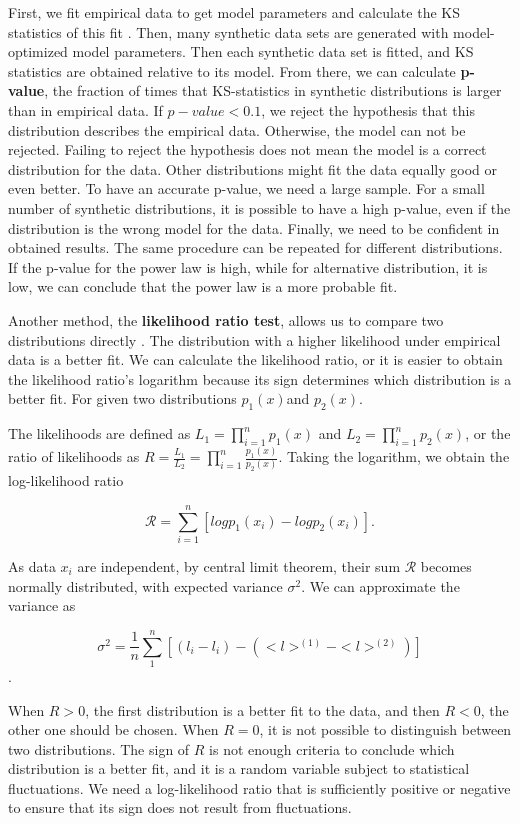 First, we fit empirical data to get model parameters and calculate the KS statistics of this fit \cite{clauset2009power}. Then, many synthetic data sets are generated with model-optimized model parameters. Then each synthetic data set is fitted, and KS statistics are obtained relative to its model. From there, we can calculate \textbf{p-value}, the fraction of times that KS-statistics in synthetic distributions is larger than in empirical data.  If $p-value<0.1$, we reject the hypothesis that this distribution describes the empirical data. Otherwise, the model can not be rejected. Failing to reject the hypothesis does not mean the model is a correct distribution for the data. Other distributions might fit the data equally good or even better. To have an accurate p-value, we need a large sample. For a small number of synthetic distributions, it is possible to have a high p-value, even if the distribution is the wrong model for the data. Finally, we need to be confident in obtained results. The same procedure can be repeated for different distributions. If the p-value for the power law is high, while for alternative distribution, it is low, we can conclude that the power law is a more probable fit. 

Another method, the \textbf{likelihood ratio test}, allows us to compare two distributions directly \cite{clauset2009power}. The distribution with a higher likelihood under empirical data is a better fit. We can calculate the likelihood ratio, or it is easier to obtain the likelihood ratio's logarithm because its sign determines which distribution is a better fit. For given two distributions $p_1(x)$and $p_2(x)$. 

The likelihoods are defined as $L_1=\prod_{i=1}^{n}p_1(x)$ and $L_2=\prod_{i=1}^{n}p_2(x)$, or the ratio of likelihoods as $R=\frac{L_1}{L_2} = \prod_{i=1}^{n} \frac{p_1(x)}{p_2(x)}$. Taking the logarithm, we obtain the log-likelihood ratio

\begin{equation}
\mathcal{R} = \sum_{i=1}^{n} \left[log p_1(x_i) - log p_2(x_i)\right].
\end{equation}

As data $x_i$ are independent, by central limit theorem, their sum $\mathcal{R}$ becomes normally distributed, with expected variance $\sigma^2$. We can approximate the variance as 

$$\sigma^2 = \frac{1}{n}\sum_{1}^{n}[(l_i - l_i) - (<l>^{(1)}- <l>^{(2)})]$$.

When $R>0$, the first distribution is a better fit to the data, and then $R<0$, the other one should be chosen. When $R=0$, it is not possible to distinguish between two distributions. The sign of $R$ is not enough criteria to conclude which distribution is a better fit, and it is a random variable subject to statistical fluctuations. We need a log-likelihood ratio that is sufficiently positive or negative to ensure that its sign does not result from fluctuations.

